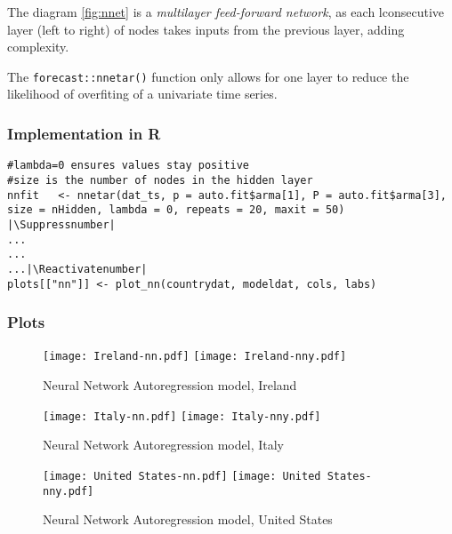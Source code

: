 The diagram \ref{fig:nnet} is a \textit{multilayer feed-forward network}, as each lconsecutive layer (left to right) of nodes takes inputs from the previous layer, adding complexity.

The \verb|forecast::nnetar()| function only allows for one layer to reduce the likelihood of overfiting of a univariate time series.

\subsubsection{Implementation in R}

\begin{lstlisting}[breaklines = true, escapeinside=||, tabsize = 4, caption = {Algorithm for NNAR Model}]
#lambda=0 ensures values stay positive
#size is the number of nodes in the hidden layer
nnfit   <- nnetar(dat_ts, p = auto.fit$arma[1], P = auto.fit$arma[3], size = nHidden, lambda = 0, repeats = 20, maxit = 50)  |\Suppressnumber|
...
...
...|\Reactivatenumber|
plots[["nn"]] <- plot_nn(countrydat, modeldat, cols, labs)
\end{lstlisting}

\subsubsection{Plots}

\begin{figure}[H]
  \texttt{[image: Ireland-nn.pdf]} \label{fig:ireland-nn}
\endminipage\hfill
{}
  \texttt{[image: Ireland-nny.pdf]} \label{fig:ireland-nny}
\endminipage
\caption{Neural Network Autoregression model, Ireland}
\end{figure}

\begin{figure}[H]
  \texttt{[image: Italy-nn.pdf]} \label{fig:italy-nn}
\endminipage\hfill
{}
  \texttt{[image: Italy-nny.pdf]} \label{fig:italy-nny}
\endminipage
\caption{Neural Network Autoregression model, Italy}
\end{figure}

\begin{figure}[H]
  \texttt{[image: United States-nn.pdf]} \label{fig:usa-nn}
\endminipage\hfill
{}
  \texttt{[image: United States-nny.pdf]} \label{fig:usa-nny}
\endminipage
\caption{Neural Network Autoregression model, United States}
\end{figure}
